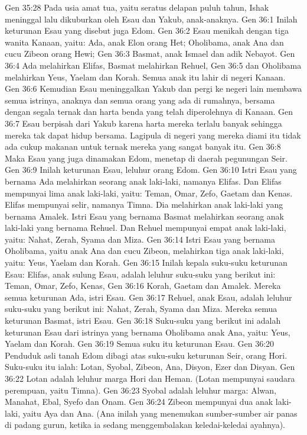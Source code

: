 Gen 35:28  Pada usia amat tua, yaitu seratus delapan puluh tahun, Ishak meninggal lalu dikuburkan oleh Esau dan Yakub, anak-anaknya.
Gen 36:1  Inilah keturunan Esau yang disebut juga Edom.
Gen 36:2  Esau menikah dengan tiga wanita Kanaan, yaitu: Ada, anak Elon orang Het; Oholibama, anak Ana dan cucu Zibeon orang Hewi;
Gen 36:3  Basmat, anak Ismael dan adik Nebayot.
Gen 36:4  Ada melahirkan Elifas, Basmat melahirkan Rehuel,
Gen 36:5  dan Oholibama melahirkan Yeus, Yaelam dan Korah. Semua anak itu lahir di negeri Kanaan.
Gen 36:6  Kemudian Esau meninggalkan Yakub dan pergi ke negeri lain membawa semua istrinya, anaknya dan semua orang yang ada di rumahnya, bersama dengan segala ternak dan harta benda yang telah diperolehnya di Kanaan.
Gen 36:7  Esau berpisah dari Yakub karena harta mereka terlalu banyak sehingga mereka tak dapat hidup bersama. Lagipula di negeri yang mereka diami itu tidak ada cukup makanan untuk ternak mereka yang sangat banyak itu.
Gen 36:8  Maka Esau yang juga dinamakan Edom, menetap di daerah pegunungan Seir.
Gen 36:9  Inilah keturunan Esau, leluhur orang Edom.
Gen 36:10  Istri Esau yang bernama Ada melahirkan seorang anak laki-laki, namanya Elifas. Dan Elifas mempunyai lima anak laki-laki, yaitu: Teman, Omar, Zefo, Gaetam dan Kenas. Elifas mempunyai selir, namanya Timna. Dia melahirkan anak laki-laki yang bernama Amalek. Istri Esau yang bernama Basmat melahirkan seorang anak laki-laki yang bernama Rehuel. Dan Rehuel mempunyai empat anak laki-laki, yaitu: Nahat, Zerah, Syama dan Miza.
Gen 36:14  Istri Esau yang bernama Oholibama, yaitu anak Ana dan cucu Zibeon, melahirkan tiga anak laki-laki, yaitu: Yeus, Yaelam dan Korah.
Gen 36:15  Inilah kepala suku-suku keturunan Esau: Elifas, anak sulung Esau, adalah leluhur suku-suku yang berikut ini: Teman, Omar, Zefo, Kenas,
Gen 36:16  Korah, Gaetam dan Amalek. Mereka semua keturunan Ada, istri Esau.
Gen 36:17  Rehuel, anak Esau, adalah leluhur suku-suku yang berikut ini: Nahat, Zerah, Syama dan Miza. Mereka semua keturunan Basmat, istri Esau.
Gen 36:18  Suku-suku yang berikut ini adalah keturunan Esau dari istrinya yang bernama Oholibama anak Ana, yaitu: Yeus, Yaelam dan Korah.
Gen 36:19  Semua suku itu keturunan Esau.
Gen 36:20  Penduduk asli tanah Edom dibagi atas suku-suku keturunan Seir, orang Hori. Suku-suku itu ialah: Lotan, Syobal, Zibeon, Ana, Disyon, Ezer dan Disyan.
Gen 36:22  Lotan adalah leluhur marga Hori dan Heman. (Lotan mempunyai saudara perempuan, yaitu Timna).
Gen 36:23  Syobal adalah leluhur marga: Alwan, Manahat, Ebal, Syefo dan Onam.
Gen 36:24  Zibeon mempunyai dua anak laki-laki, yaitu Aya dan Ana. (Ana inilah yang menemukan sumber-sumber air panas di padang gurun, ketika ia sedang menggembalakan keledai-keledai ayahnya).
